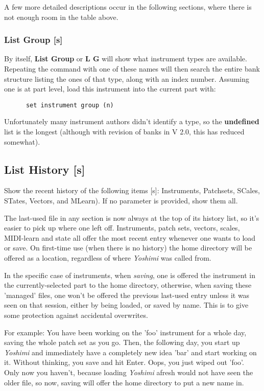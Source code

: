 A few more detailed descriptions occur in the following sections, where there
is not enough room in the table above.

\subsubsection{List Group [s]}
\label{subsec:command_line_instrument_group_list}
   By itself, \textbf{List Group} or \textbf{L G} will show what instrument types
   are available. Repeating the command with one of these names will then search
   the entire bank structure listing the ones of that type, along with an index
   number. Assuming one is at part level, load this instrument into the current
   part with:
   \begin{verbatim}
      set instrument group (n)
   \end{verbatim}

   Unfortunately many instrument authors didn't identify a type, so the
   \textbf{undefined} list is the longest (although with revision
   of banks in V 2.0, this has reduced somewhat).

\subsection{List History [s]}
\label{subsec:command_line_list_history}

   Show the recent history of the following items [s]:
   Instruments, Patchsets, SCales, STates, Vectors, and MLearn).
   If no parameter is provided, show them all.

   The last-used file in any section is now always at the top of its history list,
   so it's easier to pick up where one left off.
   Instruments, patch sets, vectors, scales, MIDI-learn and state all offer the
   most recent entry whenever one wants to load or save.  On first-time use (when
   there is no history) the home directory will be offered as a location,
   regardless of where \textsl{Yoshimi} was called from.

   In the specific case of instruments, when \textsl{saving},
   one is offered the instrument in the currently-selected part to the home
   directory, otherwise, when saving these 'managed' files,
   one won't be offered the previous last-used entry unless it was seen on that
   session, either by being loaded, or saved by name. This is to give some
   protection against accidental overwrites.

   For example:
   You have been working on the 'foo' instrument
   for a whole day, saving the whole patch set as you
   go. Then, the following day, you start up \textsl{Yoshimi}
   and immediately have a completely
   new idea 'bar' and start working on it. Without thinking, you save and hit
   Enter. Oops, you just wiped out 'foo'.
   Only now you haven't, because loading \textsl{Yoshimi}
   afresh would not have seen the older file, so now, saving
   will offer the home directory to put a new name in.

